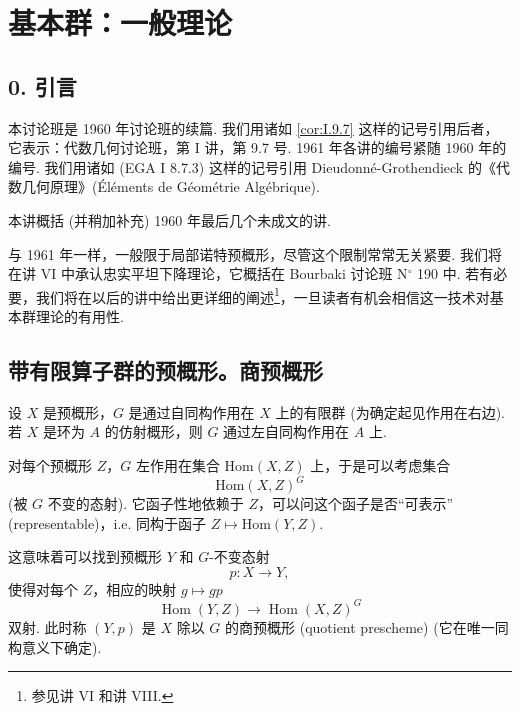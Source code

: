 \chapter{基本群：一般理论}

\section*{0. 引言}

本讨论班是 1960 年讨论班的续篇. 我们用诸如 \ref{cor:I.9.7} 这样的记号引用后者，它表示：代数几何讨论班，第 I 讲，第 9.7 号. 1961 年各讲的编号紧随 1960 年的编号. 我们用诸如 (EGA I 8.7.3) 这样的记号引用 Dieudonné-Grothendieck 的《代数几何原理》(Éléments de Géométrie Algébrique).

本讲概括 (并稍加补充) 1960 年最后几个未成文的讲.

与 1961 年一样，一般限于局部诺特预概形，尽管这个限制常常无关紧要. 我们将在讲 VI 中承认忠实平坦下降理论，它概括在 Bourbaki 讨论班 N$^{\circ}$ 190 中. 若有必要，我们将在以后的讲中给出更详细的阐述\footnote{参见讲 VI 和讲 VIII.}，一旦读者有机会相信这一技术对基本群理论的有用性.

\section{带有限算子群的预概形。商预概形}

设 $X$ 是预概形，$G$ 是通过自同构作用在 $X$ 上的有限群 (为确定起见作用在右边). 若 $X$ 是环为 $A$ 的仿射概形，则 $G$ 通过左自同构作用在 $A$ 上.

对每个预概形 $Z$，$G$ 左作用在集合 $\mathrm{Hom}(X, Z)$ 上，于是可以考虑集合
\[
\mathrm{Hom}(X, Z)^{G}
\]
(被 $G$ 不变的态射). 它函子性地依赖于 $Z$，可以问这个函子是否``可表示'' (representable)，i.e. 同构于函子 $Z \mapsto \mathrm{Hom}(Y, Z)$.

这意味着可以找到预概形 $Y$ 和 $G$-不变态射
\[
p \colon X \longrightarrow Y,
\]
使得对每个 $Z$，相应的映射 $g \mapsto gp$
\[
\operatorname{Hom}(Y, Z) \longrightarrow \operatorname{Hom}(X, Z)^{G}
\]
双射. 此时称 $(Y, p)$ 是 $X$ 除以 $G$ 的商预概形 (quotient prescheme) (它在唯一同构意义下确定).

